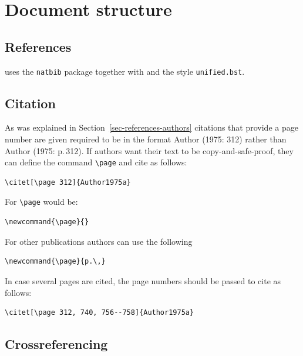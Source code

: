 \section{Document structure}




\subsection{References}

\lsp uses the \texttt{natbib} package together with \bibtex{} and the \bibtex style \texttt{unified.bst}.


\subsection{Citation}

As was explained in Section~\ref{sec-references-authors} citations that provide a page number are
given required to be in the format Author (1975: 312) rather than Author (1975: p.\,312). If authors
want their text to be copy-and-safe-proof, they can define the command \verb+\page+ and cite as
follows:
\begin{verbatim}
\citet[\page 312]{Author1975a}
\end{verbatim}
For \lsp \verb+\page+ would be:
\begin{verbatim}
\newcommand{\page}{}
\end{verbatim}
For other publications authors can use the following
\begin{verbatim}
\newcommand{\page}{p.\,}
\end{verbatim}
In case several pages are cited, the page numbers should be passed to cite as follows:
\begin{verbatim}
\citet[\page 312, 740, 756--758]{Author1975a}
\end{verbatim}


\subsection{Crossreferencing}

